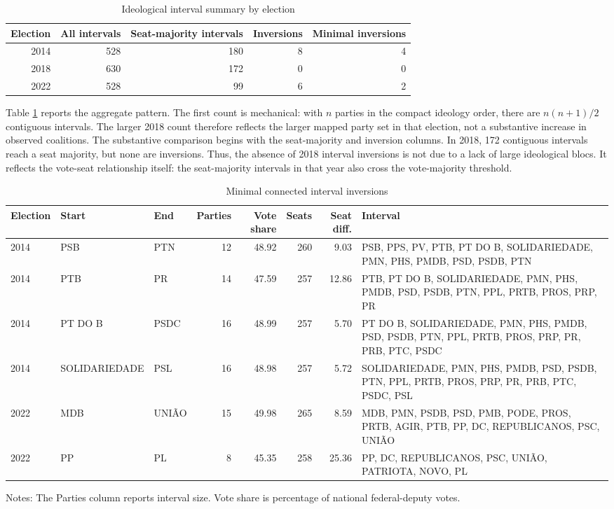 \documentclass[11pt]{article}
\begin{document}
\begin{table}[htbp]
\centering
\caption{Ideological interval summary by election}
\label{tab:interval-summary}
\small
\begin{tabular}{rrrrr}
\toprule
Election & All intervals & Seat-majority intervals & Inversions & Minimal inversions \\
\midrule
2014 & 528 & 180 & 8 & 4 \\
2018 & 630 & 172 & 0 & 0 \\
2022 & 528 & 99 & 6 & 2 \\
\bottomrule
\end{tabular}

\end{table}

Table \ref{tab:interval-summary} reports the aggregate pattern. The first
count is mechanical: with \(n\) parties in the compact ideology order, there are
\(n(n+1)/2\) contiguous intervals. The larger 2018 count therefore reflects the
larger mapped party set in that election, not a substantive increase in
observed coalitions. The substantive comparison begins with the seat-majority
and inversion columns. In 2018, 172 contiguous intervals reach a seat majority,
but none are inversions. Thus, the absence of 2018 interval inversions is not due
to a lack of large ideological blocs. It reflects the vote-seat relationship itself:
the seat-majority intervals in that year also cross the vote-majority threshold.

\begin{table}[htbp]
\centering
\caption{Minimal connected interval inversions}
\label{tab:minimal-intervals}
\scriptsize
\begin{tabularx}{\textwidth}{lllr rrrX}
\toprule
Election & Start & End & Parties & Vote share & Seats & Seat diff. & Interval \\
\midrule
2014 & PSB & PTN & 12 & 48.92 & 260 & 9.03 & PSB, PPS, PV, PTB, PT DO B, SOLIDARIEDADE, PMN, PHS, PMDB, PSD, PSDB, PTN \\
2014 & PTB & PR & 14 & 47.59 & 257 & 12.86 & PTB, PT DO B, SOLIDARIEDADE, PMN, PHS, PMDB, PSD, PSDB, PTN, PPL, PRTB, PROS, PRP, PR \\
2014 & PT DO B & PSDC & 16 & 48.99 & 257 & 5.70 & PT DO B, SOLIDARIEDADE, PMN, PHS, PMDB, PSD, PSDB, PTN, PPL, PRTB, PROS, PRP, PR, PRB, PTC, PSDC \\
2014 & SOLIDARIEDADE & PSL & 16 & 48.98 & 257 & 5.72 & SOLIDARIEDADE, PMN, PHS, PMDB, PSD, PSDB, PTN, PPL, PRTB, PROS, PRP, PR, PRB, PTC, PSDC, PSL \\
2022 & MDB & UNIÃO & 15 & 49.98 & 265 & 8.59 & MDB, PMN, PSDB, PSD, PMB, PODE, PROS, PRTB, AGIR, PTB, PP, DC, REPUBLICANOS, PSC, UNIÃO \\
2022 & PP & PL & 8 & 45.35 & 258 & 25.36 & PP, DC, REPUBLICANOS, PSC, UNIÃO, PATRIOTA, NOVO, PL \\
\bottomrule
\end{tabularx}
\begin{flushleft}
\footnotesize Notes: The Parties column reports interval size. Vote share is percentage of national federal-deputy votes.
\end{flushleft}
\end{table}
\end{document}
